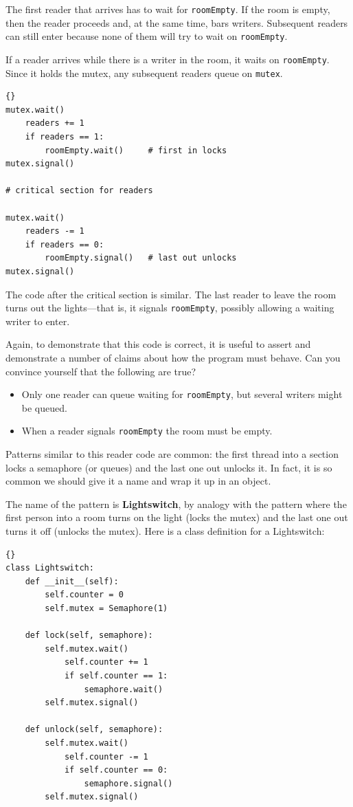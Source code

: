 \documentclass{book}
\begin{document}
The first reader that arrives has to wait for {\tt roomEmpty}.
If the room is empty, then the reader proceeds and, at the
same time, bars writers.  Subsequent readers can still enter
because none of them will try to wait on {\tt roomEmpty}.

If a reader arrives while there is a writer in the room,
it waits on {\tt roomEmpty}.  Since it holds the mutex, any
subsequent readers queue on {\tt mutex}.

\begin{lstlisting}[title={Readers solution}]{}
mutex.wait()
    readers += 1
    if readers == 1:
        roomEmpty.wait()     # first in locks
mutex.signal()

# critical section for readers

mutex.wait()
    readers -= 1
    if readers == 0:
        roomEmpty.signal()   # last out unlocks
mutex.signal()
\end{lstlisting}

The code after the critical section is similar.  The last reader
to leave the room turns out the lights---that is, it signals
{\tt roomEmpty}, possibly allowing a waiting writer to enter.

Again, to demonstrate that this code is correct, it is useful
to assert and demonstrate a number of claims about how the program
must behave.  Can you convince yourself that the following are
true?

\begin{itemize}

\item Only one reader can queue waiting for {\tt roomEmpty},
but several writers might be queued.

\item When a reader signals {\tt roomEmpty} the room must
be empty.

\end{itemize}

Patterns similar to this reader code are common: the first thread into
a section locks a semaphore (or queues) and the last one out unlocks
it.  In fact, it is so common we should give it a name and wrap it up
in an object.

The name of the pattern is {\bf Lightswitch}, by analogy with the
pattern where the first person into a room turns on the light (locks
the mutex) and the last one out turns it off (unlocks the mutex).
Here is a class definition for a Lightswitch:

\begin{lstlisting}[title={Lightswitch definition}]{}
class Lightswitch:
    def __init__(self):
        self.counter = 0
        self.mutex = Semaphore(1)

    def lock(self, semaphore):
        self.mutex.wait()
            self.counter += 1
            if self.counter == 1:
                semaphore.wait()
        self.mutex.signal()

    def unlock(self, semaphore):
        self.mutex.wait()
            self.counter -= 1
            if self.counter == 0:
                semaphore.signal()
        self.mutex.signal()
\end{lstlisting}
\end{document}
